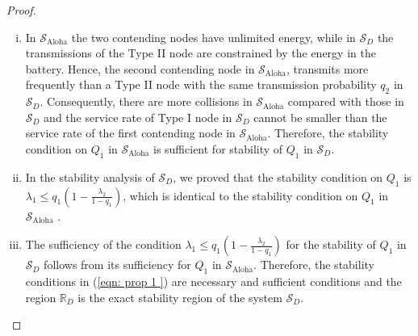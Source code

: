 \documentclass[draftcls,12pt,onecolumn]{IEEEtran}
\begin{document}
\begin{proof}
\begin{enumerate}[(i)]
\item In $\mathcal{S}_{\text{Aloha}} $ the two contending nodes have unlimited energy, while in $ \mathcal{S}_D$ the transmissions of the Type II node are constrained by the energy in the battery. Hence, the second contending node in $\mathcal{S}_{\text{Aloha}} $, transmits more frequently than a Type II node with the same transmission probability $q_2$ in $ \mathcal{S}_D$. Consequently, there are more collisions in $\mathcal{S}_{\text{Aloha}} $ compared with those in $\mathcal{S}_D $ and the service rate of Type I node in $ \mathcal{S}_D$ cannot be smaller than the service rate of the first contending node in $\mathcal{S}_{\text{Aloha}} $. Therefore, the stability condition on $ Q_1$ in $\mathcal{S}_{\text{Aloha}} $ is sufficient for stability of $Q_1$ in $\mathcal{S}_D$.

\item In the stability analysis of $\mathcal{S}_D$, we proved that the stability condition on $Q_1$ is $\lambda_1 \leq  q_1 \left( 1- \frac{\lambda_2}{1-q_1}\right)$, which is identical to the stability condition on $Q_1$ in $\mathcal{S}_{\text{Aloha}} $ \cite{rao1988stability}.

\item The sufficiency of the condition $\lambda_1 \leq  q_1 \left( 1- \frac{\lambda_2}{1-q_1}\right)$ for the stability of $ Q_1$ in $\mathcal{S}_D$ follows from its sufficiency for $ Q_1$ in $\mathcal{S}_{\text{Aloha}} $. Therefore, the stability conditions in (\ref{eqn: prop 1 }) are necessary and sufficient conditions and the region $\mathbb{R}_D $ is the exact stability region of the system $ \mathcal{S}_D$.
\end{enumerate}
\end{proof}
\vspace{-0.3in}
\end{document}
